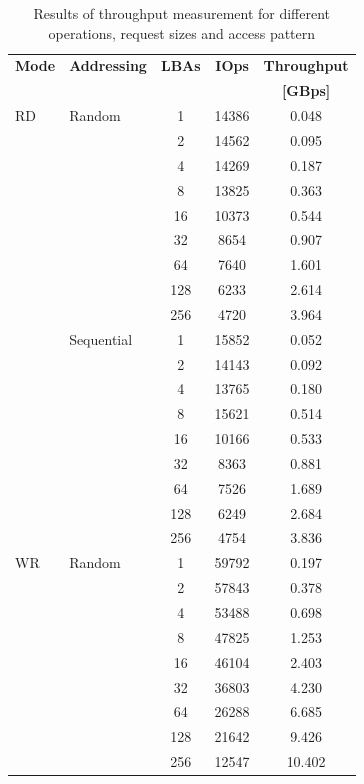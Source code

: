 \begin{table}[!ht]
    \centering
    \caption{Results of throughput measurement for different operations, request sizes and access pattern}
    \label{tab:thrp_results}
    \begin{tabular}{llSSS}
        \toprule
        \textbf{Mode} & \textbf{Addressing} & \textbf{LBAs} & \textbf{IOps} & \textbf{Throughput} \\
                    & & & & \textbf{[GBps]} \\
        \midrule
        RD & Random & 1 & 14386 & 0.048 \\
         &  & 2 & 14562 & 0.095 \\
         &  & 4 & 14269 & 0.187 \\
         &  & 8 & 13825 & 0.363 \\
         &  & 16 & 10373 & 0.544 \\
         &  & 32 & 8654 & 0.907 \\
         &  & 64 & 7640 & 1.601 \\
         &  & 128 & 6233 & 2.614 \\
         &  & 256 & 4720 & 3.964 \\
        \addlinespace
         & Sequential & 1 & 15852 & 0.052 \\
         &  & 2 & 14143 & 0.092 \\
         &  & 4 & 13765 & 0.180 \\
         &  & 8 & 15621 & 0.514 \\
         &  & 16 & 10166 & 0.533 \\
         &  & 32 & 8363 & 0.881 \\
         &  & 64 & 7526 & 1.689 \\
         &  & 128 & 6249 & 2.684 \\
         &  & 256 & 4754 & 3.836 \\
        \midrule
        WR & Random & 1 & 59792 & 0.197 \\
         &  & 2 & 57843 & 0.378 \\
         &  & 4 & 53488 & 0.698 \\
         &  & 8 & 47825 & 1.253 \\
         &  & 16 & 46104 & 2.403 \\
         &  & 32 & 36803 & 4.230 \\
         &  & 64 & 26288 & 6.685 \\
         &  & 128 & 21642 & 9.426 \\
         &  & 256 & 12547 & 10.402 \\

\end{tabular}
\end{table}
